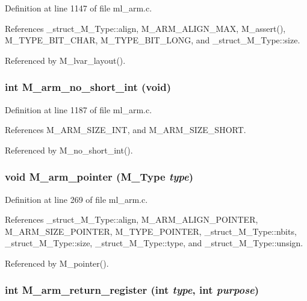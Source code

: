 Definition at line 1147 of file ml\_\-arm.c.

References \_\-struct\_\-M\_\-Type::align, M\_\-ARM\_\-ALIGN\_\-MAX, M\_\-assert(), M\_\-TYPE\_\-BIT\_\-CHAR, M\_\-TYPE\_\-BIT\_\-LONG, and \_\-struct\_\-M\_\-Type::size.

Referenced by M\_\-lvar\_\-layout().
\subsubsection{\setlength{\rightskip}{0pt plus 5cm}int M\_\-arm\_\-no\_\-short\_\-int (void)}\label{ml__arm_8c_3efeafb5f31e16dfb464876bcfbf3706}




Definition at line 1187 of file ml\_\-arm.c.

References M\_\-ARM\_\-SIZE\_\-INT, and M\_\-ARM\_\-SIZE\_\-SHORT.

Referenced by M\_\-no\_\-short\_\-int().
\subsubsection{\setlength{\rightskip}{0pt plus 5cm}void M\_\-arm\_\-pointer (\bf{M\_\-Type} {\em type})}\label{ml__arm_8c_b05f019c8111b776ba8cd6557bf1395c}




Definition at line 269 of file ml\_\-arm.c.

References \_\-struct\_\-M\_\-Type::align, M\_\-ARM\_\-ALIGN\_\-POINTER, M\_\-ARM\_\-SIZE\_\-POINTER, M\_\-TYPE\_\-POINTER, \_\-struct\_\-M\_\-Type::nbits, \_\-struct\_\-M\_\-Type::size, \_\-struct\_\-M\_\-Type::type, and \_\-struct\_\-M\_\-Type::unsign.

Referenced by M\_\-pointer().
\subsubsection{\setlength{\rightskip}{0pt plus 5cm}int M\_\-arm\_\-return\_\-register (int {\em type}, int {\em purpose})}\label{ml__arm_8c_009ce0a5e4f3153ee2e3acaf637886ea}




